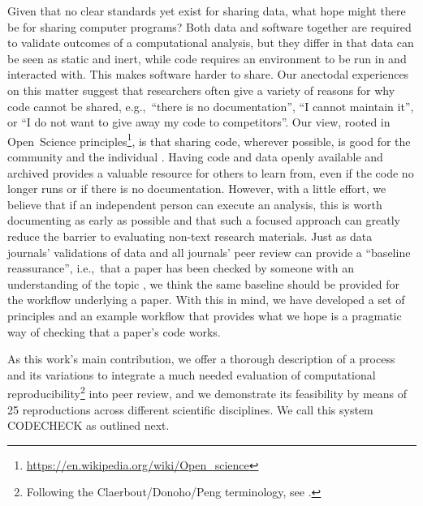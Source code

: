 \documentclass[12pt]{article}
\begin{document}
Given that no clear standards yet exist for sharing data, what hope might there be for sharing computer programs?
Both data and software together are required to validate outcomes of a computational analysis, but they differ in that data can be seen as static and inert,
while code requires an environment to be run in and interacted with.
This makes software harder to share.
Our anectodal experiences on this matter suggest that researchers often give a variety of reasons for why code cannot be shared, e.g.,~``there is no documentation'', ``I cannot maintain it'', or ``I do not want to give away my code to competitors''.
Our view, rooted in Open~Science principles\footnote{\url{https://en.wikipedia.org/wiki/Open_science}}, is that sharing code, wherever possible, is good for the community and the individual \cite{Barnes2010-iv,markowetz_five_2015}.
Having code and data openly available and archived provides a valuable resource for others to learn from, even if the code no longer runs or if there is no documentation.
However, with a little effort, we believe that if an independent person can execute an analysis, this is worth documenting as early as possible and that such a focused approach can greatly reduce the barrier to evaluating non-text research materials.
Just as data journals' validations of data and all journals' peer review can provide a ``baseline reassurance'', i.e.,~that a paper has been checked by someone with an understanding of the topic \cite{fyfe_mission_2019}, we think the same baseline should be provided for the workflow underlying a paper.
With this in mind, we have developed a set of principles and an example workflow that provides what we hope is a pragmatic way of checking that a paper's code works.

As this work's main contribution, we offer a thorough description of a process and its variations to integrate a much needed evaluation of computational reproducibility\footnote{Following the Claerbout/Donoho/Peng terminology, see \cite{barba_terminologies_2018}.} into peer review, and we demonstrate its feasibility by means of 25 reproductions across different scientific disciplines.
We call this system CODECHECK as outlined next.
\end{document}
